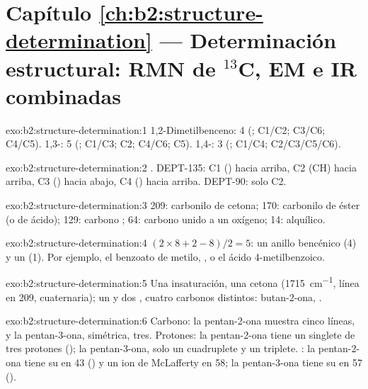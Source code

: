 \section*{Capítulo \ref{ch:b2:structure-determination} --- Determinación estructural: RMN de \texorpdfstring{$^{13}$C}{13C}, EM e IR combinadas}

\begin{solution}{exo:b2:structure-determination:1}
1,2-Dimetilbenceno: 4 (; C1/C2; C3/C6; C4/C5). 1,3-: 5 (; C1/C3; C2; C4/C6; C5).
1,4-: 3 (; C1/C4; C2/C3/C5/C6).
\end{solution}

\begin{solution}{exo:b2:structure-determination:2}
. DEPT-135: C1 () hacia arriba, C2 (CH) hacia arriba, C3 () hacia abajo, C4 () hacia arriba.
DEPT-90: solo C2.
\end{solution}

\begin{solution}{exo:b2:structure-determination:3}
209: carbonilo de cetona; 170: carbonilo de éster (o de ácido); 129: carbono ; 64: carbono unido a un
oxígeno; 14:  alquílico.
\end{solution}

\begin{solution}{exo:b2:structure-determination:4}
$(2 \times 8 + 2 - 8)/2 = 5$: un anillo bencénico (4) y un  (1). Por ejemplo, el benzoato de metilo,
, o el ácido 4-metilbenzoico.
\end{solution}

\begin{solution}{exo:b2:structure-determination:5}
Una insaturación, una cetona (\qty{1715}{cm^{-1}}, línea en 209, cuaternaria); un  y dos
, cuatro carbonos distintos: butan-2-ona, .
\end{solution}

\begin{solution}{exo:b2:structure-determination:6}
Carbono: la pentan-2-ona muestra cinco líneas, y la pentan-3-ona, simétrica, tres. Protones: la pentan-2-ona tiene un
singlete de tres protones (); la pentan-3-ona, solo un cuadruplete y un triplete. : la pentan-2-ona
tiene su  en 43 () y un ion de McLafferty en 58; la pentan-3-ona tiene su  en 57
().
\end{solution}

